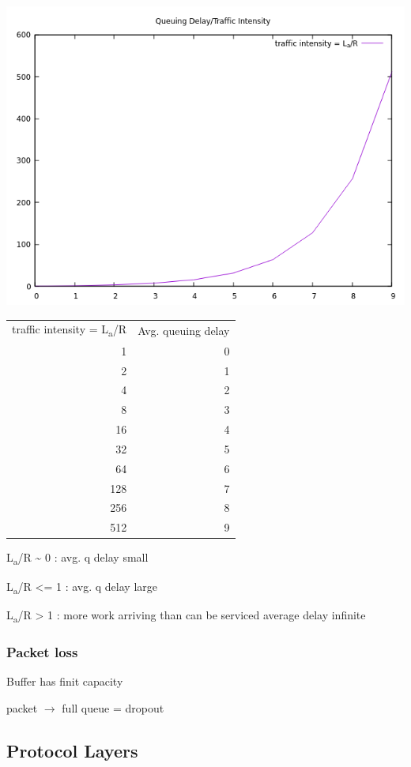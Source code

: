 \documentclass[11pt]{article}
\begin{document}
\begin{center}
\includegraphics[width=.9\linewidth]{../img/qDelay.png}
\end{center}

\begin{center}
\begin{tabular}{rr}
traffic intensity = L\textsubscript{a}/R & Avg. queuing delay\\
1 & 0\\
2 & 1\\
4 & 2\\
8 & 3\\
16 & 4\\
32 & 5\\
64 & 6\\
128 & 7\\
256 & 8\\
512 & 9\\
\end{tabular}
\end{center}


L\textsubscript{a}/R \textasciitilde{} 0 : avg. q delay small

L\textsubscript{a}/R <= 1 : avg. q delay large

L\textsubscript{a}/R > 1 : more work arriving than can be serviced average delay
infinite

\subsubsection{Packet loss}
\label{sec:org247333c}
Buffer has finit capacity 

packet \(\rightarrow\) full queue = dropout


\subsection{Protocol Layers}
\label{sec:org51d077b}
\end{document}
